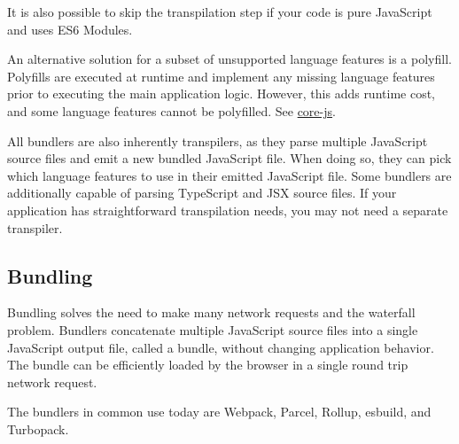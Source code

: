 \documentclass{article}
\begin{document}
It is also possible to skip the transpilation step if your code is pure JavaScript and uses ES6
Modules.

An alternative solution for a subset of unsupported language features is a polyfill. Polyfills are
executed at runtime and implement any missing language features prior to executing the main
application logic. However, this adds runtime cost, and some language features cannot be polyfilled.
See \href{https://github.com/zloirock/core-js}{core-js}.

All bundlers are also inherently transpilers, as they parse multiple JavaScript source files and
emit a new bundled JavaScript file. When doing so, they can pick which language features to use in
their emitted JavaScript file. Some bundlers are additionally capable of parsing TypeScript and JSX
source files. If your application has straightforward transpilation needs, you may not need a
separate transpiler.

\subsection{Bundling}

Bundling solves the need to make many network requests and the waterfall problem. Bundlers
concatenate multiple JavaScript source files into a single JavaScript output file, called a bundle,
without changing application behavior. The bundle can be efficiently loaded by the browser in a
single round trip network request.

The bundlers in common use today are Webpack, Parcel, Rollup, esbuild, and Turbopack.
\end{document}
